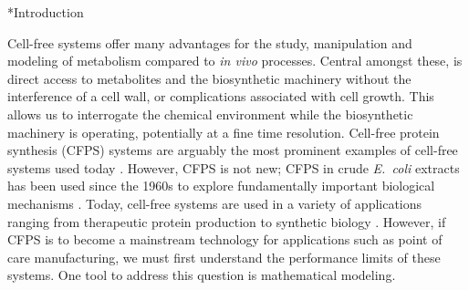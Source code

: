 \documentclass[12pt]{article}
\makeatletter
\renewcommand\section{\@startsection
	{subsection}{2}{0mm}
	{-0.2in}
	{0.05\baselineskip}
	{\normalfont\large\bfseries}}
\makeatother
\begin{document}

\section*{Introduction}

Cell-free systems offer many advantages for the study, manipulation and modeling of metabolism compared to \textit{in vivo} processes.
Central amongst these, is direct access to metabolites and the biosynthetic machinery without the interference of a cell wall, or complications associated with cell growth.
This allows us to interrogate the chemical environment while the biosynthetic machinery is operating, potentially at a fine time resolution.
Cell-free protein synthesis (CFPS) systems are arguably the most prominent examples of cell-free systems used today \citep{Jewett:2008aa}.
However, CFPS is not new; CFPS in crude \textit{E.~coli} extracts has been used since the 1960s to explore fundamentally important biological mechanisms \citep{MATTHAEI:1961aa,NIRENBERG:1961aa}.
Today, cell-free systems are used in a variety of applications ranging from therapeutic protein production \citep{Lu:2014aa} to synthetic biology \citep{Hodgman:2012aa,Pardee:2016aa}.
However, if CFPS is to become a mainstream technology for applications such as point of care manufacturing, we must first understand the performance limits of these systems.
One tool to address this question is mathematical modeling.
\end{document}
